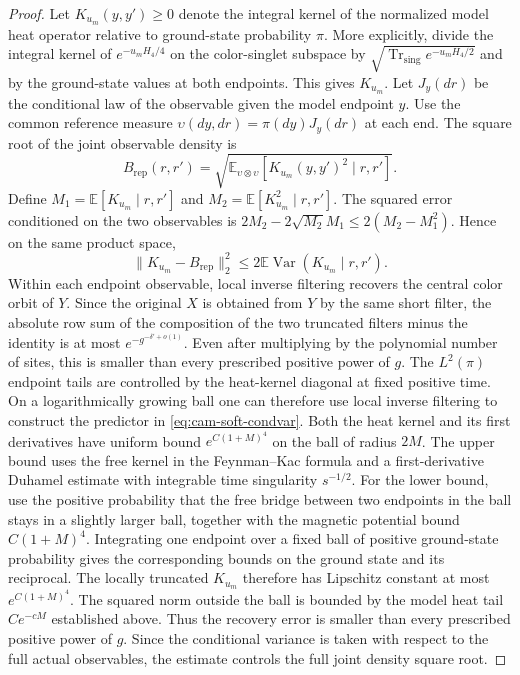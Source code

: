 \documentclass[11pt,a4paper]{article}
\numberwithin{equation}{section}
\begin{document}
\begin{proof}
Let \(K_{u_m}(y,y')\ge0\) denote the integral kernel of the normalized model heat operator relative to ground-state probability \(\pi\). More explicitly, divide the integral kernel of \(e^{-u_mH_4/4}\) on the color-singlet subspace by \(\sqrt{\operatorname{Tr}_{\mathrm{sing}} e^{-u_mH_4/2}}\) and by the ground-state values at both endpoints. This gives \(K_{u_m}\). Let \(J_y(dr)\) be the conditional law of the observable given the model endpoint \(y\). Use the common reference measure \(\upsilon(dy,dr)=\pi(dy)J_y(dr)\) at each end. The square root of the joint observable density is
\[
 B_{\mathrm{rep}}(r,r')=
 \sqrt{\mathbb E_{\upsilon\otimes\upsilon}[K_{u_m}(y,y')^2\mid r,r']}.
\]
Define \(M_1=\mathbb E[K_{u_m}\mid r,r']\) and \(M_2=\mathbb E[K_{u_m}^2\mid r,r']\). The squared error conditioned on the two observables is \(2M_2-2\sqrt{M_2}M_1\le2(M_2-M_1^2)\). Hence on the same product space,
\begin{equation}
 \|K_{u_m}-B_{\mathrm{rep}}\|_2^2
 \le 2\mathbb E\operatorname{Var}(K_{u_m}\mid r,r').
 \label{eq:cam-soft-condvar}
\end{equation}
Within each endpoint observable, local inverse filtering recovers the central color orbit of \(Y\). Since the original \(X\) is obtained from \(Y\) by the same short filter, the absolute row sum of the composition of the two truncated filters minus the identity is at most \(e^{-g^{-\delta'+o(1)}}\). Even after multiplying by the polynomial number of sites, this is smaller than every prescribed positive power of \(g\). The \(L^2(\pi)\) endpoint tails are controlled by the heat-kernel diagonal at fixed positive time. On a logarithmically growing ball one can therefore use local inverse filtering to construct the predictor in \eqref{eq:cam-soft-condvar}. Both the heat kernel and its first derivatives have uniform bound \(e^{C(1+M)^4}\) on the ball of radius \(2M\). The upper bound uses the free kernel in the Feynman--Kac formula and a first-derivative Duhamel estimate with integrable time singularity \(s^{-1/2}\). For the lower bound, use the positive probability that the free bridge between two endpoints in the ball stays in a slightly larger ball, together with the magnetic potential bound \(C(1+M)^4\). Integrating one endpoint over a fixed ball of positive ground-state probability gives the corresponding bounds on the ground state and its reciprocal. The locally truncated \(K_{u_m}\) therefore has Lipschitz constant at most \(e^{C(1+M)^4}\). The squared norm outside the ball is bounded by the model heat tail \(Ce^{-cM}\) established above. Thus the recovery error is smaller than every prescribed positive power of \(g\). Since the conditional variance is taken with respect to the full actual observables, the estimate controls the full joint density square root.


\end{proof}
\end{document}
